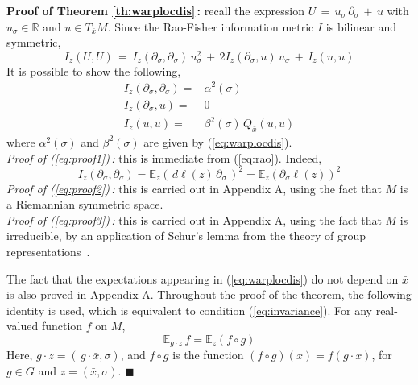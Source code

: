 \documentclass{svmult}
\begin{document}
\textbf{Proof of Theorem \ref{th:warplocdis}\,:} 
recall the expression $U \,=\, u_\sigma\,\partial_\sigma\,+\,u$ with $u_\sigma \in \mathbb{R}$ and $u \in T_{\bar{x}}M$. Since the Rao-Fisher information metric $I$ is bilinear and symmetric,
$$
I_z(U,U) \,=\, I_z(\partial_\sigma,\partial_\sigma)\,u^2_\sigma \,+\, 2I_z(\partial_\sigma,u)\,u_\sigma\,+\,I_z(u,u)
$$
It is possible to show the following,
\begin{subequations} \label{eq:proof}
\begin{eqnarray}
\label{eq:proof1} I_z(\partial_\sigma,\partial_\sigma) =& \alpha^2(\sigma) \\[0.12cm]
\label{eq:proof2} I_z(\partial_\sigma,u) =&  0 \\[0.12cm]
\label{eq:proof3} I_z(u,u) =& \beta^2(\sigma)\,Q_{\bar{x}}(u,u)  
\end{eqnarray}
\end{subequations}
where $\alpha^2(\sigma)$ and $\beta^2(\sigma)$ are given by (\ref{eq:warplocdis}). \\[0.1cm]
\textit{Proof of (\ref{eq:proof1})\,:} this is immediate from (\ref{eq:rao}). Indeed, 
$$
I_z(\partial_\sigma,\partial_\sigma) = \mathbb{E}_z\left( \,d\ell(z)\,\partial_\sigma\,\right)^2 = \mathbb{E}_z\left(\partial_\sigma\ell(z)\right)^2 
$$
\textit{Proof of (\ref{eq:proof2})\,:} this is carried out in Appendix A, using the fact that $M$ is a Riemannian symmetric space.  \\[0.1cm]
\textit{Proof of (\ref{eq:proof3})\,:} this is carried out in Appendix A, using the fact that $M$ is irreducible, by an application of Schur's lemma from the theory of group representations~\cite{knapp}.

The fact that the expectations appearing in (\ref{eq:warplocdis}) do not depend on $\bar{x}$ is also proved in Appendix A. Throughout the proof of the theorem, the following identity is used, which is equivalent to condition (\ref{eq:invariance}). For any real-valued function $f$ on $M$,
\begin{equation} \label{eq:fcirc}
\mathbb{E}_{g\cdot z} \,f =  \mathbb{E}_z\left(f\circ g\right)
\end{equation}
Here, $g\cdot z = (\,g\cdot \bar{x},\sigma)$, and $f \circ g$ is the function $(f\circ g)(x) = f(g\cdot x)$, for $g \in G$ and $z = (\bar{x},\sigma)$.  \hfill$\blacksquare$





\end{document}
